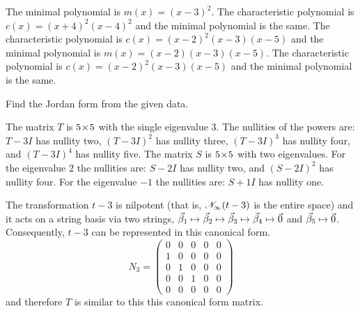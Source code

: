 \begin{exercises}
\begin{answer}
\begin{exparts}
          The minimal polynomial is $m(x)=(x-3)^2$.
        \partsitem The characteristic polynomial is $c(x)=(x+4)^2(x-4)^2$ and
          the minimal polynomial is the same.
        \partsitem The characteristic polynomial is 
          $c(x)=(x-2)^2(x-3)(x-5)$ and
          the minimal polynomial is $m(x)=(x-2)(x-3)(x-5)$.
        \partsitem The characteristic polynomial is 
          $c(x)=(x-2)^2(x-3)(x-5)$ and
          the minimal polynomial is the same.
      \end{exparts}
    \end{answer}
  \recommended \item
    Find the Jordan form from the given data.
    \begin{exparts}
       \partsitem The matrix 
         \( T \) is \( 5 \! \times \! 5 \) with the single eigenvalue $3$.
         The nullities of the powers are:
         \( T-3I \) has nullity two, \( (T-3I)^2 \) has nullity three,
         \( (T-3I)^3 \) has nullity four, and \( (T-3I)^4 \) has nullity
         five.
       \partsitem The matrix \( S \) is \( 5 \! \times \! 5 \) with two eigenvalues.
         For the eigenvalue $2$ the nullities are:
         \( S-2I \) has nullity two, and \( (S-2I)^2 \) has nullity four.
         For the eigenvalue $-1$ the nullities are:
         \( S+1I \) has nullity one.
    \end{exparts}
    \begin{answer}
      \begin{exparts}
         \partsitem The transformation $t-3$ is nilpotent 
          (that is, $\mathscr{N}_\infty(t-3)$ is the entire space)
          and it acts on a string basis via two strings, 
          $\vec{\beta}_1\mapsto\vec{\beta}_2\mapsto\vec{\beta}_3
            \mapsto\vec{\beta}_4\mapsto\vec{0}$
          and $\vec{\beta}_5\mapsto\vec{0}$.
          Consequently, $t-3$ can be represented in this canonical form.
          \begin{equation*}
            N_3=
            \begin{pmatrix}
               0  &0  &0  &0  &0  \\
               1  &0  &0  &0  &0  \\
               0  &1  &0  &0  &0  \\
               0  &0  &1  &0  &0  \\
               0  &0  &0  &0  &0
             \end{pmatrix}
          \end{equation*}
          and therefore $T$ is similar to this this canonical form matrix.

\end{exparts}
\end{answer}
\end{exercises}
